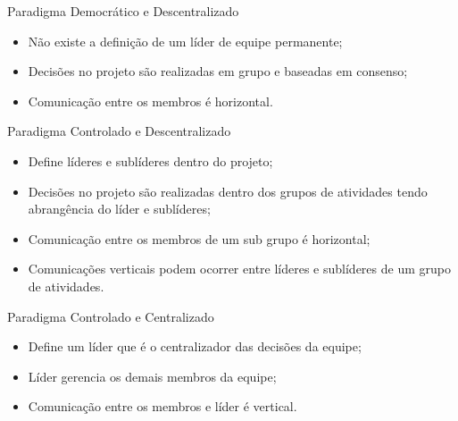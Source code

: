 \documentclass[xcolor=x11names,compress]{beamer}
\begin{document}
\begin{frame}{Paradigma Democrático e Descentralizado}

\begin{itemize}
\itemsep 5mm

\item Não existe a definição de um líder de equipe permanente;

\item Decisões no projeto são realizadas em grupo e baseadas em consenso;

\item Comunicação entre os membros é horizontal.

\end{itemize}

\end{frame}

\begin{frame}{Paradigma Controlado e Descentralizado}

\begin{itemize}
\itemsep 5mm

\item Define líderes e sublíderes dentro do projeto;

\item Decisões no projeto são realizadas dentro dos grupos de atividades tendo abrangência do líder e sublíderes;

\item Comunicação entre os membros de um sub grupo é horizontal;

\item Comunicações verticais podem ocorrer entre líderes e sublíderes de um grupo de atividades.

\end{itemize}

\end{frame}

\begin{frame}{Paradigma Controlado e Centralizado}

\begin{itemize}
\itemsep 5mm

\item Define um líder que é o centralizador das decisões da equipe;

\item Líder gerencia os demais membros da equipe;

\item Comunicação entre os membros e líder é vertical.

\end{itemize}

\end{frame}
\end{document}
